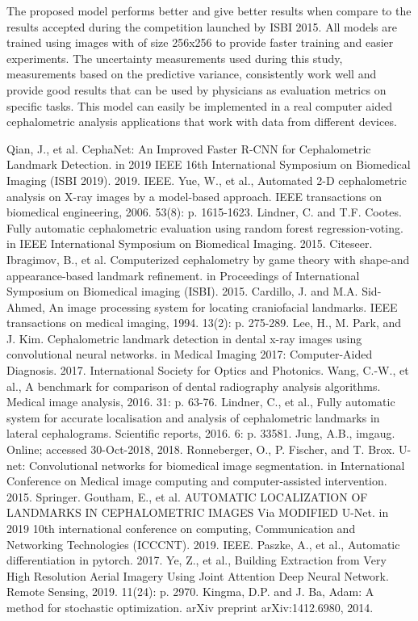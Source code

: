 \documentclass{elektr}
\begin{document}
\tab The proposed model performs better and give better results when compare to the results accepted during the competition launched by ISBI 2015. All models are trained using images with of size 256x256 to provide faster training and easier experiments. The uncertainty measurements used during this study, measurements based on the predictive variance, consistently work well and provide good results that can be used by physicians as evaluation metrics on specific tasks. This model can easily be implemented in a real computer aided cephalometric analysis applications that work with data from different devices. 

\begin{thebibliography}{99}
	 Qian, J., et al. CephaNet: An Improved Faster R-CNN for Cephalometric Landmark Detection. in 2019 IEEE 16th International Symposium on Biomedical Imaging (ISBI 2019). 2019. IEEE. 
	 Yue, W., et al., Automated 2-D cephalometric analysis on X-ray images by a model-based approach. IEEE transactions on biomedical engineering, 2006. 53(8): p. 1615-1623.
	 Lindner, C. and T.F. Cootes. Fully automatic cephalometric evaluation using random forest regression-voting. in IEEE International Symposium on Biomedical Imaging. 2015. Citeseer.
	 Ibragimov, B., et al. Computerized cephalometry by game theory with shape-and appearance-based landmark refinement. in Proceedings of International Symposium on Biomedical imaging (ISBI). 2015.
	 Cardillo, J. and M.A. Sid-Ahmed, An image processing system for locating craniofacial landmarks. IEEE transactions on medical imaging, 1994. 13(2): p. 275-289.
	 Lee, H., M. Park, and J. Kim. Cephalometric landmark detection in dental x-ray images using convolutional neural networks. in Medical Imaging 2017: Computer-Aided Diagnosis. 2017. International Society for Optics and Photonics.
	 Wang, C.-W., et al., A benchmark for comparison of dental radiography analysis algorithms. Medical image analysis, 2016. 31: p. 63-76.
	 Lindner, C., et al., Fully automatic system for accurate localisation and analysis of cephalometric landmarks in lateral cephalograms. Scientific reports, 2016. 6: p. 33581.
	 Jung, A.B., imgaug. Online; accessed 30-Oct-2018, 2018.
	 Ronneberger, O., P. Fischer, and T. Brox. U-net: Convolutional networks for biomedical image segmentation. in International Conference on Medical image computing and computer-assisted intervention. 2015. Springer.
	 Goutham, E., et al. AUTOMATIC LOCALIZATION OF LANDMARKS IN CEPHALOMETRIC IMAGES Via MODIFIED U-Net. in 2019 10th international conference on computing, Communication and Networking Technologies (ICCCNT). 2019. IEEE.
	 Paszke, A., et al., Automatic differentiation in pytorch. 2017.
	 Ye, Z., et al., Building Extraction from Very High Resolution Aerial Imagery Using Joint Attention Deep Neural Network. Remote Sensing, 2019. 11(24): p. 2970.
	 Kingma, D.P. and J. Ba, Adam: A method for stochastic optimization. arXiv preprint arXiv:1412.6980, 2014.
	
\end{thebibliography}
\end{document}
